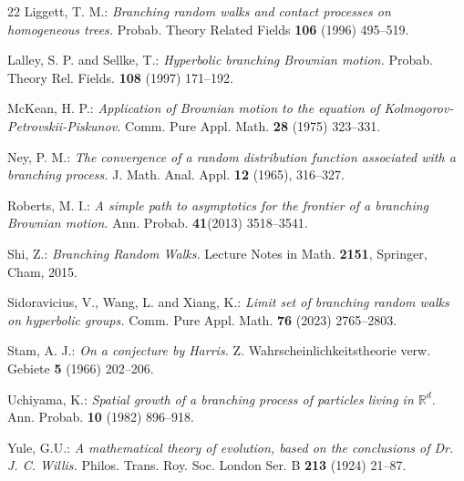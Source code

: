\documentclass[12pt]{amsart}
\newcommand\R{\mathbb R}
\numberwithin{theorem}{section}
\theoremstyle{definition}
\begin{document}
\begin{thebibliography}{22}
 Liggett, T. M.: \emph{Branching random walks and contact processes on homogeneous trees.}
Probab. Theory Related Fields {\bf 106} %
(1996) 495--519.

 Lalley, S. P. and Sellke, T.: \emph{Hyperbolic branching Brownian motion.}
Probab. Theory Rel. Fields. {\bf 108} (1997) 171--192. 

 McKean, H. P.: \emph{Application of Brownian motion to the equation of 
Kolmogorov-Petrovskii-Piskunov.}
Comm. Pure Appl. Math. {\bf 28} (1975) %
 323--331.

 Ney, P. M.: \emph{The convergence of a random distribution 
function associated with a branching process.}
J. Math. Anal. Appl. {\bf 12} (1965), 316--327.

 Roberts, M. I.: \emph{A simple path to asymptotics for the frontier of a 
branching Brownian motion.} Ann. Probab. {\bf 41}(2013) %
 3518--3541.

 Shi, Z.: \emph{Branching Random Walks.}
Lecture Notes in Math. {\bf 2151},
Springer, Cham, 2015.

 Sidoravicius, V., Wang, L. and Xiang, K.: \emph{Limit set of branching 
random walks on hyperbolic groups.}  Comm. Pure Appl. Math. {\bf 76} (2023) 2765--2803.

 Stam, A. J.: \emph{On a conjecture by Harris.} Z. Wahrscheinlichkeitstheorie 
verw. Gebiete {\bf 5} (1966) 202--206.

 Uchiyama, K.: \emph{Spatial growth of a branching process of particles living 
in $\R^d$.} Ann. Probab. {\bf 10} (1982) %
896--918.

 Yule, G.U.: \emph{A mathematical theory of evolution, based on the conclusions 
of Dr. J. C. Willis.} 
Philos. Trans. Roy. Soc. London Ser. B {\bf 213} (1924) 21--87.

\end{thebibliography}
\end{document}

